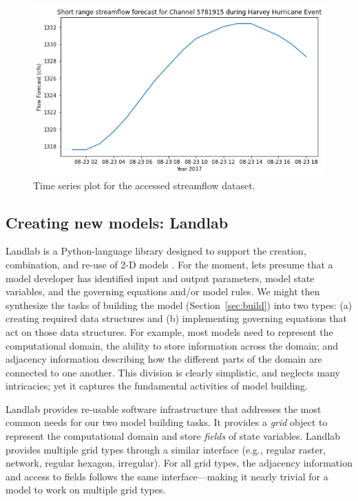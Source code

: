 \documentclass[12pt]{amsart}
\begin{document}
\begin{figure}[h!]
\centering
\includegraphics[scale=1]{Figures/data_component2.png}
\caption{Time series plot for the accessed streamflow dataset. }
\label{fig:data_component2}
\end{figure}


\subsection{Creating new models: Landlab}

Landlab is a Python-language library designed to support the creation, combination, and re-use of 2-D models \citep{hobley2017creative, barnhart2020short}. For the moment, lets presume that a model developer has identified input and output parameters, model state variables, and the governing equations and/or model rules. We might then synthesize the tasks of building the model (Section~\ref{sec:build}) into two types: (a) creating required data structures and (b) implementing governing equations that act on those data structures. For example, most models need to represent the computational domain, the ability to store information across the domain; and adjacency information describing how the different parts of the domain are connected to one another. This division is clearly simplistic, and neglects many intricacies; yet it captures the fundamental activities of model building. 

Landlab provides re-usable software infrastructure that addresses the most common needs for our two model building tasks. It provides a \textit{grid} object to represent the computational domain and store \textit{fields} of state variables. Landlab provides multiple grid types through a similar interface (e.g., regular raster, network, regular hexagon, irregular). For all grid types, the adjacency information and access to fields follows the same interface---making it nearly trivial for a model to work on multiple grid types. 
\end{document}
